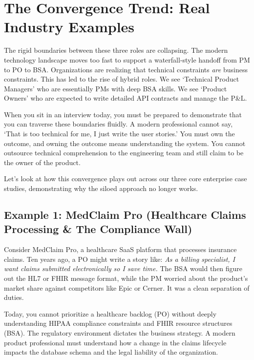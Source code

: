 \documentclass[
  11pt,
  openany,
  oneside]{book}
\begin{document}
\section{The Convergence Trend: Real Industry
Examples}\label{the-convergence-trend-real-industry-examples}

The rigid boundaries between these three roles are collapsing. The
modern technology landscape moves too fast to support a waterfall-style
handoff from PM to PO to BSA. Organizations are realizing that technical
constraints \emph{are} business constraints. This has led to the rise of
hybrid roles. We see `Technical Product Managers' who are essentially
PMs with deep BSA skills. We see `Product Owners' who are expected to
write detailed API contracts and manage the P\&L.

When you sit in an interview today, you must be prepared to demonstrate
that you can traverse these boundaries fluidly. A modern professional
cannot say, `That is too technical for me, I just write the user
stories.' You must own the outcome, and owning the outcome means
understanding the system. You cannot outsource technical comprehension
to the engineering team and still claim to be the owner of the product.

Let's look at how this convergence plays out across our three core
enterprise case studies, demonstrating why the siloed approach no longer
works.

\subsection{Example 1: MedClaim Pro (Healthcare Claims Processing \& The
Compliance
Wall)}\label{example-1-medclaim-pro-healthcare-claims-processing-the-compliance-wall}

Consider MedClaim Pro, a healthcare SaaS platform that processes
insurance claims. Ten years ago, a PO might write a story like: \emph{As
a billing specialist, I want claims submitted electronically so I save
time.} The BSA would then figure out the HL7 or FHIR message format,
while the PM worried about the product's market share against
competitors like Epic or Cerner. It was a clean separation of duties.

Today, you cannot prioritize a healthcare backlog (PO) without deeply
understanding HIPAA compliance constraints and FHIR resource structures
(BSA). The regulatory environment dictates the business strategy. A
modern product professional must understand how a change in the claims
lifecycle impacts the database schema and the legal liability of the
organization.
\end{document}
